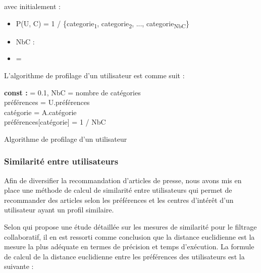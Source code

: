         avec initialement :\\
        
        \begin{itemize}[label={}]
            \item P(U, C) = 1 / \text{ }\forall {} \in \{categorie\textsubscript{1}, categorie\textsubscript{2}, ..., categorie\textsubscript{NbC}\}
            \item NbC : 
            \item \alpha = 
        \end{itemize}
        
        L'algorithme de profilage d'un utilisateur est comme suit :\\
        \begin{algorithm2e}[H]
        \SetAlgoLined
        \textbf{const :} \alpha = 0.1, NbC = nombre de catégories\\
        préférences = U.préférences\\
        catégorie = A.catégorie\\
        {
            préférences[catégorie] = 1 / NbC
        }
        \caption{Algorithme de profilage d'un utilisateur}
        \end{algorithm2e}
        \subsubsection{Similarité entre utilisateurs}
        Afin de diversifier la recommandation d'articles de presse, nous avons mis en place une méthode de calcul de similarité entre utilisateurs qui permet de recommander des articles selon les préférences et les centres d'intérêt d'un utilisateur ayant un profil similaire. 

        Selon \cite{euclidpreuve} qui propose une étude détaillée sur les mesures de similarité pour le filtrage collaboratif, il en est ressorti comme conclusion que la distance euclidienne est la mesure la plus adéquate en termes de précision et temps d'exécution. La formule de calcul de la distance euclidienne entre les préférences des utilisateurs est la suivante :

